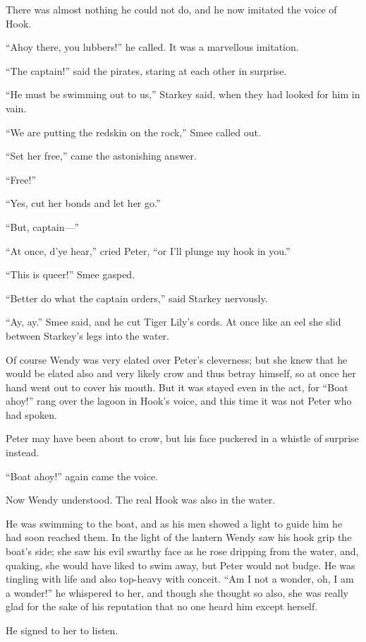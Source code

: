 There was almost nothing he could not do, and he now imitated the voice of Hook.

“Ahoy there, you lubbers!\@” he called.
It was a marvellous imitation.

“The captain!\@” said the pirates, staring at each other in surprise.

“He must be swimming out to us,” Starkey said, when they had looked for him in vain.

“We are putting the redskin on the rock,” Smee called out.

“Set her free,” came the astonishing answer.

“Free!”

“Yes, cut her bonds and let her go.”

“But, captain—”

“At once, d’ye hear,” cried Peter, “or I’ll plunge my hook in you.”

“This is queer!\@” Smee gasped.

“Better do what the captain orders,” said Starkey nervously.

“Ay, ay.”
Smee said, and he cut Tiger Lily’s cords.
At once like an eel she slid between Starkey’s legs into the water.

Of course Wendy was very elated over Peter’s cleverness;
but she knew that he would be elated also and very likely crow and thus betray himself,
so at once her hand went out to cover his mouth.
But it was stayed even in the act, for “Boat ahoy!\@” rang over the lagoon in Hook’s voice,
and this time it was not Peter who had spoken.

Peter may have been about to crow, but his face puckered in a whistle of surprise instead.

“Boat ahoy!\@” again came the voice.

Now Wendy understood.
The real Hook was also in the water.

He was swimming to the boat, and as his men showed a light to guide him he had soon reached them.
In the light of the lantern Wendy saw his hook grip the boat’s side;
she saw his evil swarthy face as he rose dripping from the water,
and, quaking, she would have liked to swim away, but Peter would not budge.
He was tingling with life and also top-heavy with conceit.
“Am I not a wonder, oh, I am a wonder!\@” he whispered to her,
and though she thought so also,
she was really glad for the sake of his reputation that no one heard him except herself.

He signed to her to listen.

